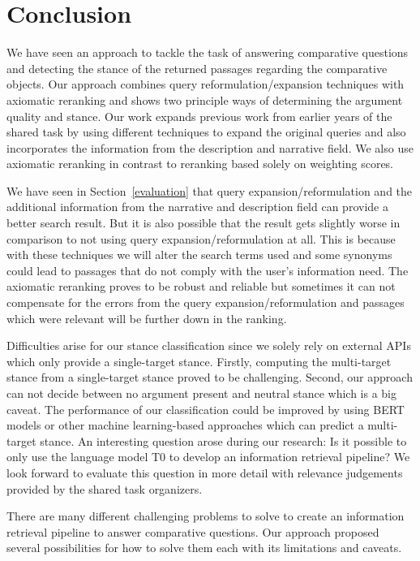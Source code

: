 \section{Conclusion}

We have seen an approach to tackle the task of answering comparative questions and detecting the stance of the returned passages regarding the comparative objects.
Our approach combines query reformulation/expansion techniques with axiomatic reranking and shows two principle ways of determining the argument quality and stance.
Our work expands previous work from earlier years of the shared task by using different techniques to expand the original queries and also incorporates the information from the description and narrative field.
We also use axiomatic reranking in contrast to reranking based solely on weighting scores.

We have seen in Section~\ref{evaluation} that query expansion/reformulation and the additional information from the narrative and description field can provide a better search result.
But it is also possible that the result gets slightly worse in comparison to not using query expansion/reformulation at all.
This is because with these techniques we will alter the search terms used and some synonyms could lead to passages that do not comply with the user's information need.
The axiomatic reranking proves to be robust and reliable but sometimes it can not compensate for the errors from the query expansion/reformulation and passages which were relevant will be further down in the ranking.

Difficulties arise for our stance classification since we solely rely on external APIs which only provide a single-target stance.
Firstly, computing the multi-target stance from a single-target stance proved to be challenging.
Second, our approach can not decide between no argument present and neutral stance which is a big caveat.
The performance of our classification could be improved by using BERT models or other machine learning-based approaches which can predict a multi-target stance.
An interesting question arose during our research:
Is it possible to only use the language model T0 to develop an information retrieval pipeline?
We look forward to evaluate this question in more detail with relevance judgements provided by the shared task organizers.

There are many different challenging problems to solve to create an information retrieval pipeline to answer comparative questions.
Our approach proposed several possibilities for how to solve them each with its limitations and caveats.
